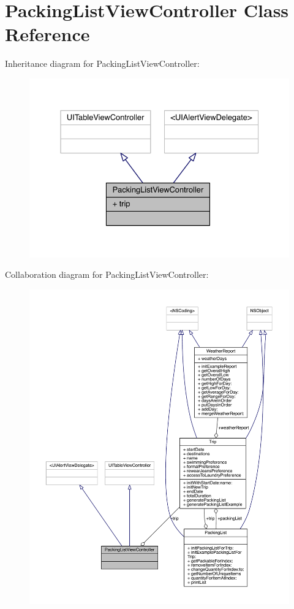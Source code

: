 \hypertarget{interface_packing_list_view_controller}{\section{Packing\-List\-View\-Controller Class Reference}
\label{interface_packing_list_view_controller}
}


Inheritance diagram for Packing\-List\-View\-Controller\-:\nopagebreak
\begin{figure}[H]
\begin{center}
\leavevmode
\includegraphics[width=331pt]{interface_packing_list_view_controller__inherit__graph}
\end{center}
\end{figure}


Collaboration diagram for Packing\-List\-View\-Controller\-:
\nopagebreak
\begin{figure}[H]
\begin{center}
\leavevmode
\includegraphics[width=350pt]{interface_packing_list_view_controller__coll__graph}
\end{center}
\end{figure}
